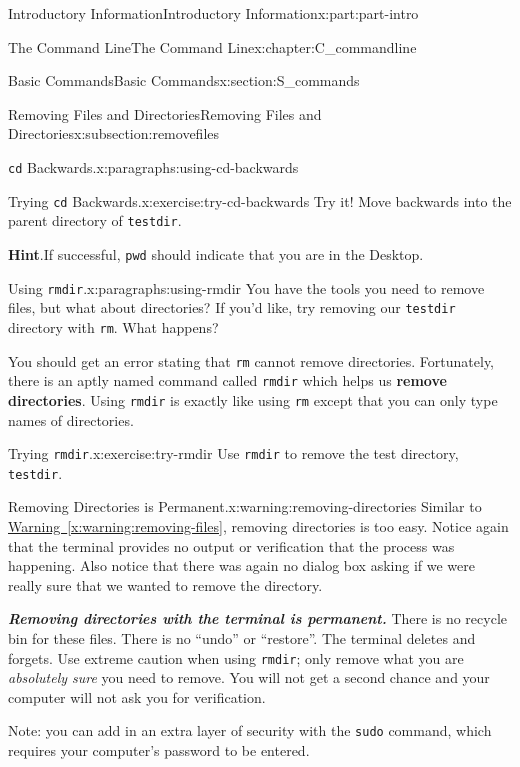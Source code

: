 \documentclass[oneside,10pt,]{book}
\newcommand{\blocktitlefont}{\relax}
\newcommand{\xreffont}{\relax}
\newcommand{\mono}[1]{\texttt{#1}}
\newcommand{\alert}[1]{\textbf{\textit{#1}}}
\newcommand{\terminology}[1]{\textbf{#1}}
\begin{document}
\begin{partptx}{Introductory Information}{}{Introductory Information}{}{}{x:part:part-intro}
\begin{chapterptx}{The Command Line}{}{The Command Line}{}{}{x:chapter:C_commandline}
\begin{sectionptx}{Basic Commands}{}{Basic Commands}{}{}{x:section:S_commands}
\begin{subsectionptx}{Removing Files and Directories}{}{Removing Files and Directories}{}{}{x:subsection:removefiles}
\begin{paragraphs}{\mono{cd} Backwards.}{x:paragraphs:using-cd-backwards}
\begin{inlineexercise}{Trying \mono{cd} Backwards.}{x:exercise:try-cd-backwards}%
Try it! Move backwards into the parent directory of \mono{testdir}.%
\par\smallskip%
\noindent\textbf{\blocktitlefont Hint}.\hypertarget{g:hint:idp615574424}{}\quad{}If successful, \mono{pwd} should indicate that you are in the Desktop.%
\end{inlineexercise}%
\end{paragraphs}%
\begin{paragraphs}{Using \mono{rmdir}.}{x:paragraphs:using-rmdir}%
\index{\mono{rmdir}}%
%
\index{command line!\mono{rmdir}}%
You have the tools you need to remove files, but what about directories? If you'd like, try removing our \mono{testdir} directory with \mono{rm}. What happens?%
\par
You should get an error stating that \mono{rm} cannot remove directories. Fortunately, there is an aptly named command called \mono{rmdir} which helps us \terminology{remove directories}. Using \mono{rmdir} is exactly like using \mono{rm} except that you can only type names of directories.%
\begin{inlineexercise}{Trying \mono{rmdir}.}{x:exercise:try-rmdir}%
Use \mono{rmdir} to remove the test directory, \mono{testdir}.%
\end{inlineexercise}%
\begin{warning}{Removing Directories is Permanent.}{x:warning:removing-directories}%
%
Similar to \hyperref[x:warning:removing-files]{Warning~{\xreffont\ref{x:warning:removing-files}}}, removing directories is too easy. Notice again that the terminal provides no output or verification that the process was happening. Also notice that there was again no dialog box asking if we were really sure that we wanted to remove the directory.%
\par
\alert{Removing directories with the terminal is permanent.} There is no recycle bin for these files. There is no ``undo'' or ``restore''. The terminal deletes and forgets. Use extreme caution when using \mono{rmdir}; only remove what you are \emph{absolutely sure} you need to remove. You will not get a second chance and your computer will not ask you for verification.%
\par
Note: you can add in an extra layer of security with the \mono{sudo} command, which requires your computer's password to be entered.%
\end{warning}
\end{paragraphs}%

\end{subsectionptx}
\end{sectionptx}
\end{chapterptx}
\end{partptx}
\end{document}

